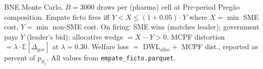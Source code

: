 \begin{table}[!htbp]
\centering
\begin{threeparttable}
\caption{V4 \emph{empate ficto} (LC 123/2006 arts.~44--45, Preg\~ao): structural quantification of the right-to-match.}
\label{tab:v4_empate}
\small
\setlength{\tabcolsep}{4pt}
\begin{tablenotes}\footnotesize
\item BNE Monte Carlo, $B = 3000$ draws per (pharma) cell at Pre-period Preg\~ao composition.
Empate ficto fires iff $Y < X \le (1+0.05)\cdot Y$ where $X = \min$ SME cost, $Y = \min$ non-SME cost.
On firing: SME wins (matches leader); government pays $Y$ (leader's bid); allocative wedge $= X - Y > 0$.
MCPF distortion $= \lambda \cdot \mathbb{E}[\Delta_{\text{gov}}]$ at $\lambda = 0.30$.
Welfare loss $= $ DWL$_{\text{alloc}} + $ MCPF dist., reported as percent of $p_{S_1}$.
All values from \texttt{empate\_ficto.parquet}.
\end{tablenotes}
\end{threeparttable}
\end{table}
